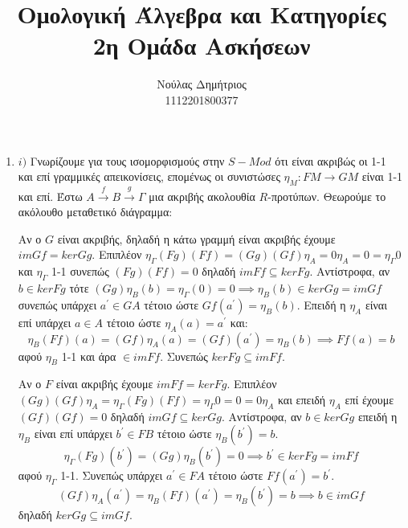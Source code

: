 \documentclass{article}
\title{\textbf{Ομολογική Άλγεβρα και Κατηγορίες} \\ 2η Ομάδα Ασκήσεων}
\author{Νούλας Δημήτριος \\ 1112201800377}
\begin{document}
\maketitle

\begin{enumerate}

	\item $i)$ Γνωρίζουμε για τους ισομορφισμούς στην $S-Mod$ ότι είναι ακριβώς οι 1-1 και επί γραμμικές απεικονίσεις, επομένως οι συνιστώσες $\eta _M : FM \rightarrow GM$ είναι 1-1 και επί. Έστω $A \xrightarrow{f} B \xrightarrow{g} \Gamma$ μια ακριβής ακολουθία $R$-προτύπων. Θεωρούμε το ακόλουθο μεταθετικό διάγραμμα:

		\begin{center}
		\end{center}
	
		Αν ο $G$ είναι ακριβής, δηλαδή η κάτω γραμμή είναι ακριβής έχουμε $imGf = kerGg$. Επιπλέον $\eta_{\Gamma} (Fg) (Ff) = (Gg)(Gf)\eta_A = 0 \eta_A = 0 = \eta_{\Gamma} 0$ και $\eta_{\Gamma} $ 1-1 συνεπώς $(Fg) (Ff) = 0$ δηλαδή $imFf \subseteq kerFg$. Αντίστροφα, αν $b \in kerFg$ τότε $(Gg) \eta_B (b) = \eta_{\Gamma} (0) = 0 \implies \eta_B (b) \in kerGg = imGf$ συνεπώς υπάρχει $a^{\prime} \in GA$ τέτοιο ώστε $Gf(a^{\prime} ) = \eta_B (b)$. Επειδή η $\eta_A$ είναι επί υπάρχει $a \in A$ τέτοιο ώστε $\eta_A (a) = a^{\prime}$ και:
		\[\eta_B (Ff) (a) = (Gf)\eta_A (a) = (Gf) (a^{\prime}) = \eta_B (b) \implies Ff(a) = b\]
	αφού $\eta_B$ 1-1 και άρα $\in imFf$. Συνεπώς $kerFg \subseteq imFf$.
	$ $\newline

	Αν ο $F$ είναι ακριβής έχουμε $imFf = kerFg$. Επιπλέον $(Gg)(Gf)\eta_A = \eta_{\Gamma} (Fg)(Ff) = \eta_{\Gamma} 0 = 0 = 0 \eta_A$ και επειδή $\eta_A$ επί έχουμε $(Gf)(Gf)= 0$ δηλαδή $imGf \subseteq kerGg$. Αντίστροφα, αν $b \in kerGg$ επειδή η $\eta_B$ είναι επί υπάρχει $b^{\prime} \in FB$ τέτοιο ώστε $\eta_B (b^{\prime} ) = b$.
	\[ \eta_{\Gamma} (Fg) (b^{\prime} ) = (Gg)\eta_B (b^{\prime}) = 0 \implies b^{\prime} \in kerFg = imFf \]
	αφού $\eta_{\Gamma}$ 1-1. Συνεπώς υπάρχει $a^{\prime} \in FA$ τέτοιο ώστε $Ff(a^{\prime} ) = b^{\prime}$.
	\[ (Gf) \eta_A (a^{\prime} ) = \eta_B (Ff) (a^{\prime} )  = \eta_B (b^{\prime})  =b \implies b \in imGf\]
	δηλαδή $kerGg \subseteq imGf$.
	$ $\newline	


\end{enumerate}
\end{document}
